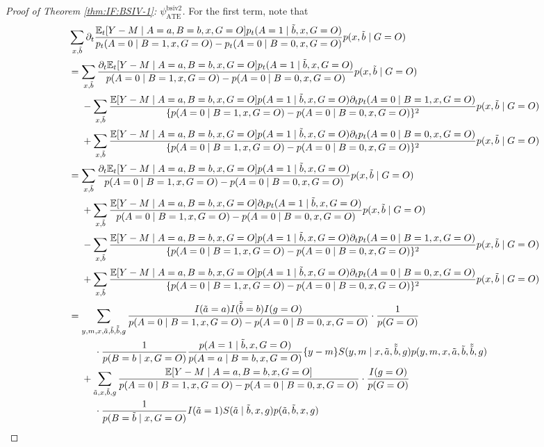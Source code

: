 \documentclass[10pt]{article}
\begin{document}
\begin{proof}[Proof of Theorem \ref{thm:IF:BSIV-1}: $\psi_{\text{ATE}}^{\text{bsiv2}}$]
 For the first term, note that
{\footnotesize \begin{align*}
    &\sum_{x,\Tilde{b}}\partial_t\frac{\mathbb{E}_t[Y-M\mid A=a,B=b,x,G=O]p_t(A=1\mid \Tilde{b},x,G=O)}{p_t(A=0\mid B=1,x,G=O)-p_t(A=0\mid B=0,x,G=O)}p(x, \Tilde{b}\mid G=O)\\
    &=\sum_{x,\Tilde{b}}\frac{\partial_t\mathbb{E}_t[Y-M\mid A=a,B=b,x,G=O]p_t(A=1\mid \Tilde{b},x,G=O)}{p(A=0\mid B=1,x,G=O)-p(A=0\mid B=0,x,G=O)}p(x, \Tilde{b}\mid G=O)\\
    &\ \ \ \ -\sum_{x,\Tilde{b}}\frac{\mathbb{E}[Y-M\mid A=a,B=b,x,G=O]p(A=1\mid \Tilde{b},x,G=O)\partial_tp_t(A=0\mid B=1,x,G=O)}{\{p(A=0\mid B=1,x,G=O)-p(A=0\mid B=0,x,G=O)\}^2}p(x, \Tilde{b}\mid G=O)\\
    &\ \ \ \ +\sum_{x,\Tilde{b}}\frac{\mathbb{E}[Y-M\mid A=a,B=b,x,G=O]p(A=1\mid \Tilde{b},x,G=O)\partial_tp_t(A=0\mid B=0,x,G=O)}{\{p(A=0\mid B=1,x,G=O)-p(A=0\mid B=0,x,G=O)\}^2}p(x, \Tilde{b}\mid G=O)\\
    &=\sum_{x,\Tilde{b}}\frac{\partial_t\mathbb{E}_t[Y-M\mid A=a,B=b,x,G=O]p(A=1\mid \Tilde{b},x,G=O)}{p(A=0\mid B=1,x,G=O)-p(A=0\mid B=0,x,G=O)}p(x, \Tilde{b}\mid G=O)\\
    &\ \ \ \ +\sum_{x,\Tilde{b}}\frac{\mathbb{E}[Y-M\mid A=a,B=b,x,G=O]\partial_tp_t(A=1\mid \Tilde{b},x,G=O)}{p(A=0\mid B=1,x,G=O)-p(A=0\mid B=0,x,G=O)}p(x, \Tilde{b}\mid G=O)\\
    &\ \ \ \ -\sum_{x,\Tilde{b}}\frac{\mathbb{E}[Y-M\mid A=a,B=b,x,G=O]p(A=1\mid \Tilde{b},x,G=O)\partial_tp_t(A=0\mid B=1,x,G=O)}{\{p(A=0\mid B=1,x,G=O)-p(A=0\mid B=0,x,G=O)\}^2}p(x, \Tilde{b}\mid G=O)\\
    &\ \ \ \ +\sum_{x,\Tilde{b}}\frac{\mathbb{E}[Y-M\mid A=a,B=b,x,G=O]p(A=1\mid \Tilde{b},x,G=O)\partial_tp_t(A=0\mid B=0,x,G=O)}{\{p(A=0\mid B=1,x,G=O)-p(A=0\mid B=0,x,G=O)\}^2}p(x, \Tilde{b}\mid G=O)\\
    &=\sum_{y,m,x,\Tilde{a},\Tilde{b},\Tilde{\Tilde{b}},g}\frac{I(\Tilde{a}=a)I(\Tilde{\Tilde{b}}=b)I(g=O)}{p(A=0\mid B=1,x,G=O)-p(A=0\mid B=0,x,G=O)}\cdot\frac{1}{p(G=O)}\\
    &\ \ \ \ \ \ \ \ \cdot\frac{1}{p(B=b\mid x,G=O)}\frac{p(A=1\mid \Tilde{b},x,G=O)}{p(A=a\mid B=b,x,G=O)}\{y-m\}S(y,m\mid x,\Tilde{a},\Tilde{\Tilde{b}},g)p(y,m,x,\Tilde{a},\Tilde{b},\Tilde{\Tilde{b}},g)\\
    &\ \ \ \ +\sum_{\Tilde{a},x,\Tilde{b},g}\frac{\mathbb{E}[Y-M\mid A=a,B=b,x,G=O]}{p(A=0\mid B=1,x,G=O)-p(A=0\mid B=0,x,G=O)}\cdot\frac{I(g=O)}{p(G=O)}\\
    &\ \ \ \ \ \ \ \ \cdot\frac{1}{p(B=\Tilde{b}\mid x, G=O)}I(\Tilde{a}=1)S(\Tilde{a}\mid \Tilde{b},x,g)p(\Tilde{a},\Tilde{b},x,g)\\

\end{align*}}
\end{proof}
\end{document}

